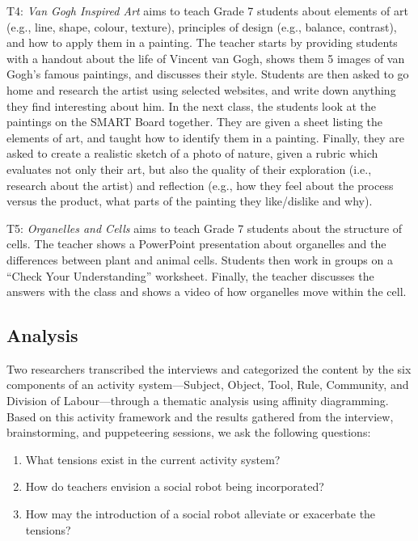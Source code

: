 T4: \textit{Van Gogh Inspired Art} aims to teach Grade 7 students about elements of art (e.g., line, shape, colour, texture), principles of design (e.g., balance, contrast), and how to apply them in a painting.  The teacher starts by providing students with a handout about the life of Vincent van Gogh, shows them 5 images of van Gogh's famous paintings, and discusses their style.  Students are then asked to go home and research the artist using selected websites, and write down anything they find interesting about him. In the next class, the students look at the paintings on the SMART Board together. They are given a sheet listing the elements of art, and taught how to identify them in a painting. Finally, they are asked to create a realistic sketch of a photo of nature, given a rubric which evaluates not only their art, but also the quality of their exploration (i.e., research about the artist) and reflection (e.g., how they feel about the process versus the product, what parts of the painting they like/dislike and why).  

T5: \textit{Organelles and Cells} aims to teach Grade 7 students about the structure of cells.  The teacher shows a PowerPoint presentation about organelles and the differences between plant and animal cells.  Students then work in groups on a ``Check Your Understanding'' worksheet.  Finally, the teacher discusses the answers with the class and shows a video of how organelles move within the cell.  



\subsection{Analysis}
\label{sec:10}
Two researchers transcribed the interviews and categorized the content by the six components of an activity system---Subject, Object, Tool, Rule, Community, and Division of Labour---through a thematic analysis using affinity diagramming. Based on this activity framework and the results gathered from the interview, brainstorming, and puppeteering sessions, we ask the following questions: 
\begin{enumerate}
    \item What tensions exist in the current activity system?
    \item How do teachers envision a social robot being incorporated?
    \item How may the introduction of a social robot alleviate or exacerbate the tensions?
\end{enumerate}  

